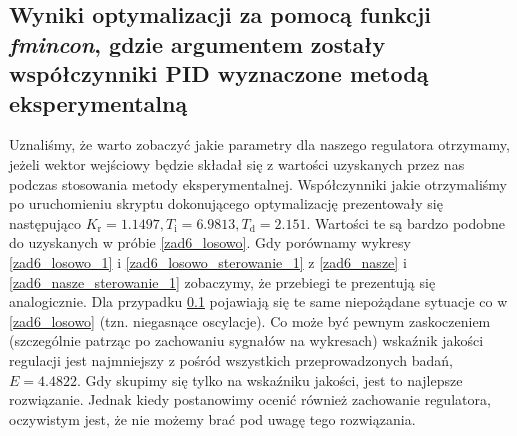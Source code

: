 \subsection{Wyniki optymalizacji za pomocą funkcji \textit{fmincon}, gdzie argumentem zostały współczynniki PID wyznaczone metodą eksperymentalną }
\label{zad6_nasz_opis}
Uznaliśmy, że warto zobaczyć jakie parametry dla naszego regulatora otrzymamy, jeżeli wektor wejściowy będzie składał się z wartości uzyskanych przez nas podczas stosowania metody eksperymentalnej. Współczynniki jakie otrzymaliśmy po uruchomieniu skryptu dokonującego optymalizację prezentowały się następująco $K_{\mathrm{r}} = \num{1.1497}, {T_{\mathrm{i}} = 6.9813}, {T_{\mathrm{d}} = \num{2.151}}$. Wartości te są bardzo podobne do uzyskanych w próbie \ref{zad6_losowo}. Gdy porównamy wykresy \ref{zad6_losowo_1} i \ref{zad6_losowo_sterowanie_1} z \ref{zad6_nasze} i \ref{zad6_nasze_sterowanie_1} zobaczymy, że przebiegi te prezentują się analogicznie. Dla przypadku \ref{zad6_nasz_opis} pojawiają się te same niepożądane sytuacje co w \ref{zad6_losowo} (tzn. niegasnące oscylacje). Co może być pewnym zaskoczeniem (szczególnie patrząc po zachowaniu sygnałów na wykresach) wskaźnik jakości regulacji jest najmniejszy z pośród wszystkich przeprowadzonych badań, $E = \num{4.4822}$. Gdy skupimy się tylko na wskaźniku jakości, jest to najlepsze rozwiązanie. Jednak kiedy postanowimy ocenić również zachowanie regulatora, oczywistym jest, że nie możemy brać pod uwagę tego rozwiązania. 

